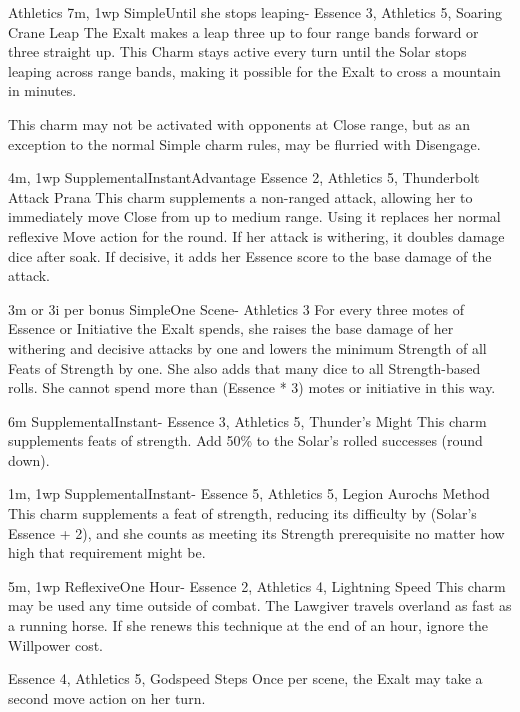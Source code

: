 \begin{Ability}{Athletics}
  {7m, 1wp}
  {Simple}{Until she stops leaping}{-}
  {Essence 3, Athletics 5, Soaring Crane Leap}
  The Exalt makes a leap three up to four range bands forward or three straight up. This Charm stays active every turn until the Solar stops leaping across range bands, making it possible for the Exalt to cross a mountain in minutes.

  This charm may not be activated with opponents at Close range, but as an exception to the normal Simple charm rules, may be flurried with Disengage.

  {4m, 1wp}
  {Supplemental}{Instant}{Advantage}
  {Essence 2, Athletics 5, Thunderbolt Attack Prana}
  This charm supplements a non-ranged attack, allowing her to immediately move Close from up to medium range. Using it replaces her normal reflexive Move action for the round. If her attack is withering, it doubles damage dice after soak. If decisive, it adds her Essence score to the base damage of the attack.

  {3m or 3i per bonus}
  {Simple}{One Scene}{-}
  {Athletics 3}
  For every three motes of Essence or Initiative the Exalt spends, she raises the base damage of her withering and decisive attacks by one and lowers the minimum Strength of all Feats of Strength by one. She also adds that many dice to all Strength-based rolls. She cannot spend more than (Essence * 3) motes or initiative in this way.

  {6m}
  {Supplemental}{Instant}{-}
  {Essence 3, Athletics 5, Thunder's Might}
  This charm supplements feats of strength. Add 50\% to the Solar's rolled successes (round down).

  {1m, 1wp}
  {Supplemental}{Instant}{-}
  {Essence 5, Athletics 5, Legion Aurochs Method}
  This charm supplements a feat of strength, reducing its difficulty by (Solar's Essence + 2), and she counts as meeting its Strength prerequisite no matter how high that requirement might be.

  {5m, 1wp}
  {Reflexive}{One Hour}{-}
  {Essence 2, Athletics 4, Lightning Speed}
  This charm may be used any time outside of combat. The Lawgiver travels overland as fast as a running horse. If she renews this technique at the end of an hour, ignore the Willpower cost.

  {Essence 4, Athletics 5, Godspeed Steps}
  Once per scene, the Exalt may take a second move action on her turn.

\end{Ability}

